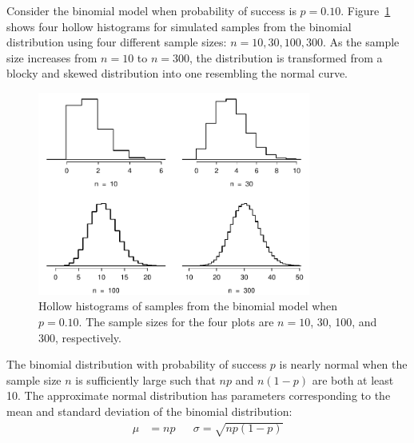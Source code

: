 Consider the binomial model when probability of success is $p=0.10$. Figure~\ref{fourBinomialModelsShowingApproxToNormal} shows four hollow histograms for simulated samples from the binomial distribution using four different sample sizes: $n=10, 30, 100, 300$. As the sample size increases from $n=10$ to $n=300$, the distribution is transformed from a blocky and skewed distribution into one resembling the normal curve.
	
\begin{figure}[h!]
		\centering
		\includegraphics[width=0.80\textwidth]{ch_distributions_oi_biostat/figures/fourBinomialModelsShowingApproxToNormal/fourBinomialModelsShowingApproxToNormal}
		\caption{Hollow histograms of samples from the binomial model when $p=0.10$. The sample sizes for the four plots are $n=10$, 30, 100, and 300, respectively.}
		\label{fourBinomialModelsShowingApproxToNormal}
\end{figure}
	
\begin{termBox}{
			The binomial distribution with probability of success $p$ is nearly normal when the sample size $n$ is sufficiently large such that $np$ and $n(1-p)$ are both at least 10. The approximate normal distribution has parameters corresponding to the mean and standard deviation of the binomial distribution:\vspace{-1.5mm}
			\begin{align*}
			\mu &= np
			&&\sigma= \sqrt{np(1-p)}
			\end{align*}}
\end{termBox}

